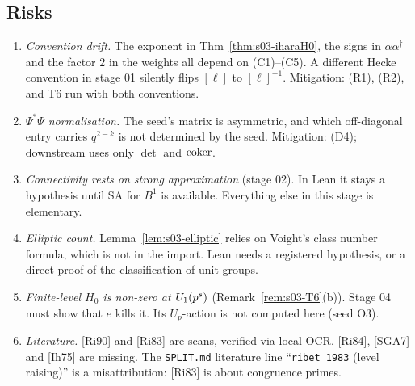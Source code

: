 \subsection{Risks}
\begin{enumerate}[label=R\arabic*.]
\item \emph{Convention drift.} The exponent in Thm~\ref{thm:s03-iharaH0}, the signs in $\alpha\alpha^\dagger$ and the factor $2$ in the
  weights all depend on (C1)--(C5). A different Hecke convention in stage 01 silently flips $[\ell]$ to $[\ell]^{-1}$. Mitigation:
  (R1), (R2), and T6 run with both conventions.
\item \emph{$\Psi^*\Psi$ normalisation.} The seed's matrix is asymmetric, and which off-diagonal entry carries $q^{2-k}$ is not
  determined by the seed. Mitigation: (D4); downstream uses only $\det$ and $\operatorname{coker}$.
\item \emph{Connectivity rests on strong approximation} (stage 02). In Lean it stays a hypothesis until SA for $B^1$ is available.
  Everything else in this stage is elementary.
\item \emph{Elliptic count.} Lemma~\ref{lem:s03-elliptic} relies on Voight's class number formula, which is not in the import. Lean
  needs a registered hypothesis, or a direct proof of the classification of unit groups.
\item \emph{Finite-level $H_0$ is non-zero at $U_1(p^s)$} (Remark~\ref{rem:s03-T6}(b)). Stage 04 must show that $e$ kills it. Its
  $U_p$-action is not computed here (seed O3).
\item \emph{Literature.} [Ri90] and [Ri83] are scans, verified via local OCR. [Ri84], [SGA7] and [Ih75] are missing. The
  \texttt{SPLIT.md} literature line ``\texttt{ribet\_1983} (level raising)'' is a misattribution: [Ri83] is about congruence primes.
\end{enumerate}
